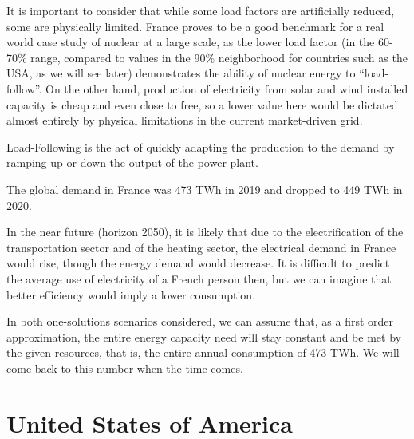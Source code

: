 It is important to consider that while some load factors are artificially reduced, some are physically limited. France proves to be a good benchmark for a real world case study of nuclear at a large scale, as the lower load factor (in the 60-70\% range, compared to values in the 90\% neighborhood for countries such as the USA, as we will see later) demonstrates the ability of nuclear energy to “load-follow”. On the other hand, production of electricity from solar and wind installed capacity is cheap and even close to free, so a lower value here would be dictated almost entirely by physical limitations in the current market-driven grid.


\begin{kaobox}[frametitle=Load Follow]
Load-Following is the act of quickly adapting the production to the demand by ramping up or down the output of the power plant.
\end{kaobox}

The global demand in France was 473 TWh in 2019 and dropped to 449 TWh in 2020.


In the near future (horizon 2050), it is likely that due to the electrification of the transportation sector and of the heating sector, the electrical demand in France would rise, though the energy demand would decrease. It is difficult to predict the average use of electricity of a French person then, but we can imagine that better efficiency would imply a lower consumption.


In both one-solutions scenarios considered, we can assume that, as a first order approximation, the entire energy capacity need will stay constant and be met by the given resources, that is, the entire annual consumption of 473 TWh. We will come back to this number when the time comes.




\section{United States of America}

